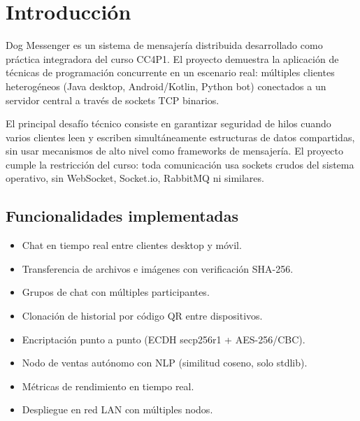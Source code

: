 \documentclass[12pt,a4paper]{article}
\begin{document}
\hypersetup{pageanchor=true}
\tableofcontents
\newpage

\section{Introducción}

Dog Messenger es un sistema de mensajería distribuida desarrollado como
práctica integradora del curso CC4P1. El proyecto demuestra la aplicación
de técnicas de programación concurrente en un escenario real: múltiples
clientes heterogéneos (Java desktop, Android/Kotlin, Python bot) conectados
a un servidor central a través de sockets TCP binarios.

El principal desafío técnico consiste en garantizar seguridad de hilos
cuando varios clientes leen y escriben simultáneamente estructuras de datos
compartidas, sin usar mecanismos de alto nivel como frameworks de mensajería.
El proyecto cumple la restricción del curso: toda comunicación usa sockets
crudos del sistema operativo, sin WebSocket, Socket.io, RabbitMQ ni similares.

\subsection{Funcionalidades implementadas}

\begin{itemize}[leftmargin=1.5cm]
  \item[\checkmark] Chat en tiempo real entre clientes desktop y móvil.
  \item[\checkmark] Transferencia de archivos e imágenes con verificación SHA-256.
  \item[\checkmark] Grupos de chat con múltiples participantes.
  \item[\checkmark] Clonación de historial por código QR entre dispositivos.
  \item[\checkmark] Encriptación punto a punto (ECDH secp256r1 + AES-256/CBC).
  \item[\checkmark] Nodo de ventas autónomo con NLP (similitud coseno, solo stdlib).
  \item[\checkmark] Métricas de rendimiento en tiempo real.
  \item[\checkmark] Despliegue en red LAN con múltiples nodos.
\end{itemize}

\end{document}
